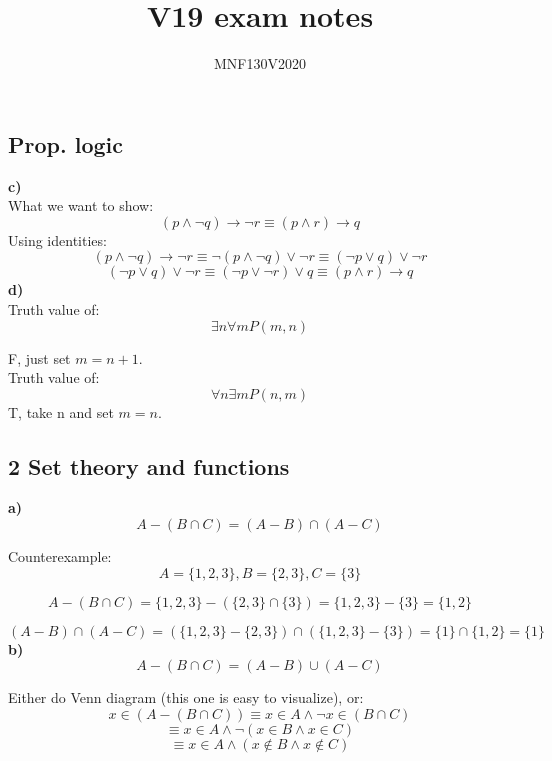 \documentclass[12pt]{article}
\title{\huge V19 exam notes}
\author{\LARGE MNF130V2020}
\begin{document}
\maketitle

\bigskip

\newpage

\subsection{Prop. logic}

\textbf{c)} \\

What we want to show: 
$$
(p \wedge \neg q) \rightarrow \neg r \equiv (p \wedge r) \rightarrow q
$$
Using identities: \\
$$
(p \wedge \neg q) \rightarrow \neg r \equiv \neg (p \wedge \neg q) \vee \neg r \equiv (\neg p \vee q) \vee \neg r
$$
$$
(\neg p \vee q) \vee \neg r \equiv (\neg p \vee \neg r) \vee q \equiv (p \wedge r) \rightarrow q
$$
\textbf{d)} \\

Truth value of: \\
$$
\exists n \forall m P(m,n)
$$

F, just set $m = n + 1$.\\

Truth value of: \\
$$
\forall n \exists m P(n,m)
$$
T, take n and set $m=n$.
\subsection{2 Set theory and functions}

\textbf{a)} \\

$$
A - (B \cap C) = (A - B) \cap (A - C)
$$

Counterexample:
$$
A = \{1,2,3\}, B = \{2,3\}, C = \{3\}
$$

$$
A - (B \cap C) = \{1,2,3\} - (\{2,3\} \cap \{3\}) = \{1,2,3\} - \{3\} = \{1,2\}
$$

$$
(A - B) \cap (A - C)  = (\{1,2,3\} - \{2,3\}) \cap (\{1,2,3\} - \{3\}) = \{1\} \cap \{1,2\} = \{1\}
$$
\newpage
\textbf{b)} \\

$$
A - (B \cap C) = (A - B) \cup (A - C)
$$

Either do Venn diagram (this one is easy to visualize), or: \\

$$
x \in (A - (B \cap C)) \equiv x \in A \wedge \neg x \in (B \cap C)
$$
$$
\equiv x \in A \wedge \neg (x \in B \wedge x \in C)
$$
$$
\equiv x \in A \wedge (x \notin B \wedge x \notin C)
$$
\end{document}
